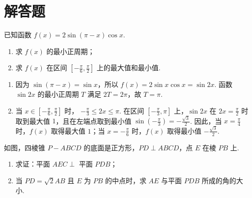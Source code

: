 \section{解答题}

\begin{problem}
已知函数 \( f(x) = 2\sin (\pi - x)\cos x \).
\begin{enumerate}
\item 求 \( f(x) \) 的最小正周期；
\item 求 \( f(x) \) 在区间 \( \left[-\frac{\pi}{6}, \frac{\pi}{2}\right] \) 上的最大值和最小值.
\end{enumerate}

\end{problem}

\begin{solution}
\begin{enumerate}
\item 因为 \(\sin(\pi-x)=\sin x\)，所以
\(f(x)=2\sin x\cos x=\sin 2x\).
函数 \(\sin 2x\) 的最小正周期 \(T\) 满足 \(2T=2\pi\)，故 \(T=\pi\).

\item 当 \(x\in\left[-\frac{\pi}{6},\frac{\pi}{2}\right]\) 时，
\(-\frac{\pi}{3}\leqslant 2x\leqslant\pi\).
在区间 \(\left[-\frac{\pi}{3},\pi\right]\) 上，\(\sin 2x\) 在 \(2x=\frac{\pi}{2}\) 时取到最大值 \(1\)，且在左端点取到最小值 \(\sin\left(-\frac{\pi}{3}\right)=-\frac{\sqrt{3}}{2}\).
因此，当 \(x=\frac{\pi}{4}\) 时，\(f(x)\) 取得最大值 \(1\)；当 \(x=-\frac{\pi}{6}\) 时，\(f(x)\) 取得最小值 \(-\frac{\sqrt{3}}{2}\).
\end{enumerate}
\end{solution}

\begin{problem}
如图，四棱锥 \(P - ABCD\) 的底面是正方形，\(PD \perp ABCD\)，点 \(E\) 在棱 \(PB\) 上.
\begin{enumerate}
\item 求证：平面 \( AEC \perp \) 平面 \(PDB\)；
\item 当 \(PD = \sqrt{2} AB\) 且 \(E\) 为 \(PB\) 的中点时，求 \(AE\) 与平面 \(PDB\) 所成的角的大小.
\end{enumerate}


\end{problem}

